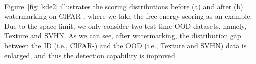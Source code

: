 \documentclass{article}
\begin{document}
\begin{figure*}[t]
\centering  
{} 
~~~~~~~~~~~~~~~~
\caption{An illustration on CIFAR- dataset regarding the free energy scoring. (a) depicts the scoring distributions before watermarking, and (b) is the scoring distributions after watermarking. } \label{fig: kde2}
\end{figure*}




Figure~\ref{fig: kde2} illustrates the scoring distributions before (a) and after (b) watermarking on CIFAR-, where we take the free energy scoring as an example. Due to the space limit, we only consider two test-time OOD datasets, namely, Texture and SVHN. As we can see, after watermarking, the distribution gap between the ID (i.e., CIFAR-) and the OOD (i.e., Texture and SVHN) data is enlarged, and thus the detection capability is improved.
\end{document}
